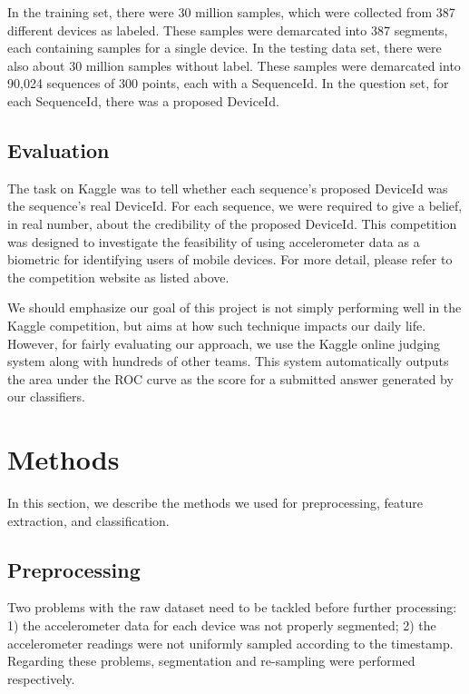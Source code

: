 \documentclass{article} %
\begin{document}
In the training set, there were 30 million samples, which were collected from 387 different devices as labeled. These samples were demarcated into 387 segments, each containing samples for a single device. In the testing data set, there were also about 30 million samples without label. These samples were demarcated into 90,024 sequences of 300 points, each with a SequenceId. In the question set, for each SequenceId, there was a proposed DeviceId.

\subsection{Evaluation}
The task on Kaggle was to tell whether each sequence's proposed DeviceId was the sequence's real DeviceId. For each sequence, we were required to give a belief, in real number, about the credibility of the proposed DeviceId. This competition was designed to investigate the feasibility of using accelerometer data as a biometric for identifying users of mobile devices. For more detail, please refer to the competition website as listed above.

We should emphasize our goal of this project is not simply performing well in the Kaggle competition, but aims at how such technique impacts our daily life. However, for fairly evaluating our approach, we use the Kaggle online judging system along with hundreds of other teams. This system automatically outputs the area under the ROC curve as the score for a submitted answer generated by our classifiers. 


\section{Methods}
In this section, we describe the methods we used for preprocessing, feature extraction, and classification.


\subsection{Preprocessing}
Two problems with the raw dataset need to be tackled before further processing: 1) the accelerometer data for each device was not properly segmented; 2) the accelerometer readings were not uniformly sampled according to the timestamp. Regarding these problems, segmentation and re-sampling were performed respectively.
\end{document}
